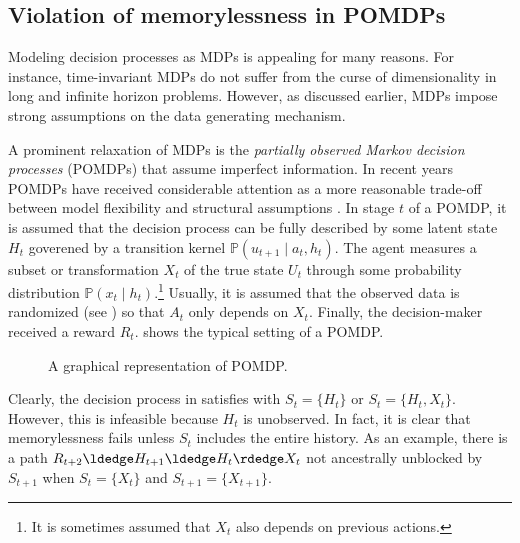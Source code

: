 \documentclass[12pt,a4paper]{article}
\theoremstyle{definition}
\newcommand{\PP}[0]{\mathbb{P}}
\begin{document}
\subsection{Violation of memorylessness in POMDPs}\label{subsec:pomdps}
Modeling decision processes as MDPs is appealing for many reasons. For
instance, time-invariant MDPs do not suffer from the curse of
dimensionality in long and infinite horizon
problems. %
However, as discussed earlier, MDPs impose strong assumptions
on the data generating mechanism. %

A prominent relaxation of MDPs is the \emph{partially observed Markov
  decision processes} (POMDPs) \parencite{ASTROM1965174,
  KAELBLING199899} that assume imperfect
information. In recent years POMDPs have received considerable
attention as a more reasonable trade-off between model flexibility and
structural assumptions \parencite[e.g.][]{guo2016pac}. In stage $t$
of a POMDP, it is assumed that the decision process can be fully
described by some latent state $H_t$ goverened by a transition kernel
$\PP(u_{t+1} \mid a_t, h_t)$. The agent measures a subset or
transformation $X_t$ of the true state $U_t$ through some probability
distribution $\PP(x_t \mid h_t)$.\footnote{It is sometimes
  assumed that $X_t$ also depends on previous actions.} Usually, it is
assumed that the observed data is randomized (see
) so that $A_t$ only
depends on $X_t$. Finally, the decision-maker received a reward
$R_t$.  shows the typical setting of a POMDP.

\begin{figure}[t]
  \centering
  \caption{A graphical representation of POMDP.}
  \label{fig:pomdp}
\end{figure}

Clearly, the decision process in  satisfies
with $S_t = \{H_t\}$ or $S_t = \{H_t, X_t\}$. However, this is
infeasible because $H_t$ is unobserved. In fact, it is clear that
memorylessness fails unless $S_t$ includes the entire history. As an
example, there is a path $
  R_{t+2} \ldedge H_{t+1} \ldedge H_t \rdedge X_t$ not ancestrally
  unblocked by $S_{t+1}$ when $S_t = \{X_t\}$ and $S_{t+1} =
  \{X_{t+1}\}$.
\end{document}
